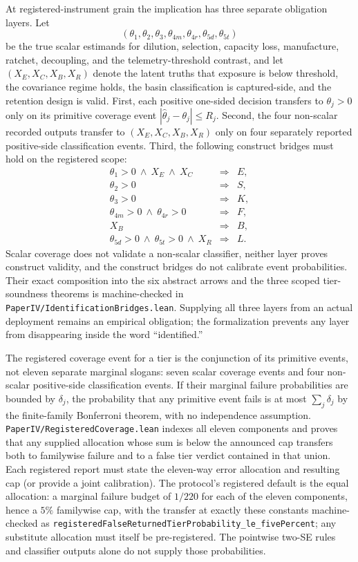 \documentclass[11pt]{article}
\theoremstyle{definition}
\theoremstyle{remark}
\numberwithin{equation}{section}
\begin{document}
At registered-instrument grain the implication has three separate obligation
layers. Let
\[
(\theta_1,\theta_2,\theta_3,\theta_{4m},\theta_{4r},\theta_{5d},\theta_{5t})
\]
be the true scalar estimands for dilution, selection, capacity loss,
manufacture, ratchet, decoupling, and the telemetry-threshold contrast, and let
$(X_E,X_C,X_B,X_R)$ denote the latent truths that exposure is below threshold,
the covariance regime holds, the basin classification is captured-side, and
the retention design is valid. First, each positive one-sided decision
transfers to $\theta_j>0$ only on its primitive coverage event
$|\hat\theta_j-\theta_j|\le R_j$. Second, the four non-scalar recorded outputs
transfer to $(X_E,X_C,X_B,X_R)$ only on four separately reported positive-side
classification events. Third, the following construct bridges must hold on
the registered scope:
\[
\begin{array}{rcl}
 \theta_1>0\ \wedge\ X_E\ \wedge\ X_C &\Longrightarrow& E,\\
 \theta_2>0 &\Longrightarrow& S,\\
 \theta_3>0 &\Longrightarrow& K,\\
 \theta_{4m}>0\ \wedge\ \theta_{4r}>0 &\Longrightarrow& F,\\
 X_B &\Longrightarrow& B,\\
 \theta_{5d}>0\ \wedge\ \theta_{5t}>0\ \wedge\
   X_R &\Longrightarrow& L.
\end{array}
\]
Scalar coverage does not validate a non-scalar classifier, neither layer proves
construct validity, and the construct bridges do not calibrate event
probabilities. Their exact composition into the six abstract arrows and the
three scoped tier-soundness theorems is machine-checked in
\texttt{PaperIV/IdentificationBridges.lean}. Supplying all three layers from an
actual deployment remains an empirical obligation; the formalization prevents
any layer from disappearing inside the word ``identified.''

The registered coverage event for a tier is the conjunction of its primitive
events, not eleven separate marginal slogans: seven scalar coverage events and
four non-scalar positive-side classification events. If their marginal failure
probabilities are bounded by $\delta_j$, the probability that any primitive
event fails is at most $\sum_j\delta_j$ by the finite-family Bonferroni theorem,
with no independence assumption. \texttt{PaperIV/RegisteredCoverage.lean}
indexes all eleven components and proves that any supplied allocation whose
sum is below the announced cap transfers both to familywise failure and to a
false tier verdict contained in that union. Each registered report must state
the eleven-way error allocation and resulting cap (or provide a joint
calibration). The protocol's registered default is the equal allocation: a
marginal failure budget of $1/220$ for each of the eleven components, hence a
$5\%$ familywise cap, with the transfer at exactly these constants
machine-checked as
\texttt{registeredFalseReturnedTierProbability\_le\_fivePercent}; any
substitute allocation must itself be pre-registered. The pointwise two-SE
rules and classifier outputs alone do not supply those probabilities.
\end{document}
